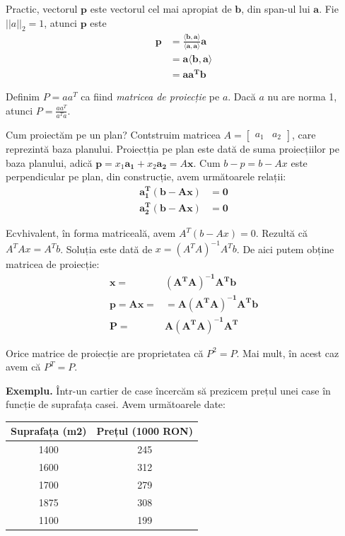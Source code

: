 \documentclass{exam}
\begin{document}
Practic, vectorul $\mathbf{p}$ este vectorul cel mai apropiat de $\mathbf{b}$,
din span-ul lui $\mathbf{a}$. Fie $||a||_2 = 1$, atunci $\mathbf{p}$ este
\begin{align*}
	\mathbf{p} & = \mathbf{\frac{\langle b, a \rangle}{\langle a, a \rangle} a} \\
	           & = \mathbf{a \langle b, a \rangle}                              \\
	           & = \mathbf{a a^T b}
\end{align*}

Definim $P = a a^T$ ca fiind \textit{matricea de proiecție} pe $a$. Dacă $a$ nu
are norma 1, atunci $P = \frac{a a^T}{a^T a}$.

Cum proiectăm pe un plan? Contstruim matricea $A = \begin{bmatrix} a_1 & a_2 \end{bmatrix}$,
care reprezintă baza planului. Proiectția pe plan este dată de suma proiecțiilor
pe baza planului, adică $\mathbf{p} = x_1 \mathbf{a_1} + x_2 \mathbf{a_2} = A \mathbf{x}$.
Cum $b - p = b - Ax$ este perpendicular pe plan, din construcție, avem
următoarele relații:
\begin{align*}
	\mathbf{a_1^T (b - Ax)} & \mathbf{= 0} \\
	\mathbf{a_2^T (b - Ax)} & \mathbf{= 0}
\end{align*}

Ecvhivalent, în forma matriceală, avem $A^T (b - Ax) = 0$. Rezultă că
$A^T A x = A^T b$. Soluția este dată de $x = (A^T A)^{-1} A^T b$. De aici putem
obține matricea de proiecție:
\begin{align*}
	\mathbf{x = }      & \mathbf{(A^T A)^{-1} A^T b}     \\
	\mathbf{p = A x =} & = \mathbf{A (A^T A)^{-1} A^T b} \\
	\mathbf{P = }      & \mathbf{A (A^T A)^{-1} A^T}
\end{align*}

Orice matrice de proiecție are proprietatea că $P^2 = P$. Mai mult, în acest caz
avem că $P^T = P$.

\textbf{Exemplu.} Într-un cartier de case încercăm să prezicem prețul unei case
în funcție de suprafața casei. Avem următoarele date:

\begin{center}
	\begin{tabular}{|c|c|}
		\hline
		Suprafața (m2) & Prețul (1000 RON) \\
		\hline
		1400           & 245               \\
		1600           & 312               \\
		1700           & 279               \\
		1875           & 308               \\
		1100           & 199               \\
		\hline
	\end{tabular}
\end{center}
\end{document}

